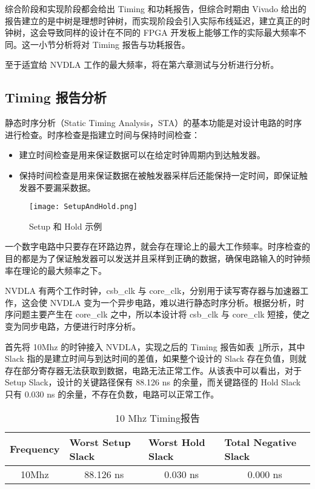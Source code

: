 综合阶段和实现阶段都会给出 Timing 和功耗报告，但综合时期由 Vivado 给出的报告建立的是中树是理想时钟树，而实现阶段会引入实际布线延迟，建立真正的时钟树，这会导致同样的设计在不同的 FPGA 开发板上能够工作的实际最大频率不同。这一小节分析将对 Timing 报告与功耗报告。

至于适宜给 NVDLA 工作的最大频率，将在第六章测试与分析进行分析。

\subsection{Timing 报告分析}

静态时序分析（Static Timing Analysis，STA）的基本功能是对设计电路的时序进行检查。时序检查是指建立时间与保持时间检查：
\begin{itemize}
    \item 建立时间检查是用来保证数据可以在给定时钟周期内到达触发器。
    \item 保持时间检查是用来保证数据在被触发器采样后还能保持一定时间，即保证触发器不要漏采数据。
\end{itemize}

\begin{figure}[!htbp]
    \centering
    \texttt{[image: SetupAndHold.png]}
    \caption{Setup 和 Hold 示例}
    \label{fig:Setup and Hold}
\end{figure}

一个数字电路中只要存在环路边界，就会存在理论上的最大工作频率。时序检查的目的都是为了保证触发器可以发送并且采样到正确的数据，确保电路输入的时钟频率在理论的最大频率之下。

NVDLA 有两个工作时钟，csb\_clk 与 core\_clk，分别用于读写寄存器与加速器工作，这会使 NVDLA 变为一个异步电路，难以进行静态时序分析。根据分析，时序问题主要产生在 core\_clk 之中，所以本设计将 csb\_clk 与 core\_clk 短接，使之变为同步电路，方便进行时序分析。

首先将 10Mhz 的时钟接入 NVDLA，实现之后的 Timing 报告如表~\ref{tab:10Mhz Timing}所示，其中 Slack 指的是建立时间与到达时间的差值，如果整个设计的 Slack 存在负值，则就存在部分寄存器无法获取到数据，电路无法正常工作。从该表中可以看出，对于 Setup Slack，设计的关键路径保有 88.126 ns 的余量，而关键路径的 Hold Slack 只有 0.030 ns 的余量，不存在负数，电路可以正常工作。

\begin{table}[!htbp]
    \caption{10 Mhz Timing报告}
    \label{tab:10Mhz Timing}
    \centering
    \footnotesize%
    \setlength{\tabcolsep}{4pt}%
    \renewcommand{\arraystretch}{1.2}%
    \begin{tabular}{llll}
        \toprule
        \textbf{Frequency}        & \textbf{Worst Setup Slack}    & \textbf{Worst Hold Slack}    & \textbf{Total Negative Slack} \\
        \midrule
        \multicolumn{1}{c}{10Mhz} & \multicolumn{1}{c}{88.126 ns} & \multicolumn{1}{c}{0.030 ns} & \multicolumn{1}{c}{0.000 ns} \\
        \bottomrule                   
    \end{tabular}
\end{table}

